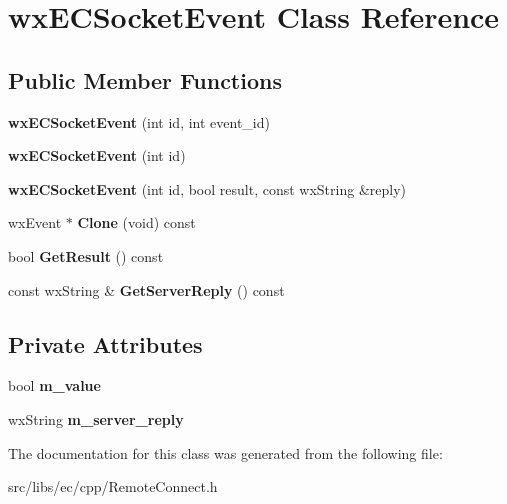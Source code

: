 \section{wxECSocketEvent Class Reference}
\label{classwxECSocketEvent}
\subsection*{Public Member Functions}
\begin{DoxyCompactItemize}
\item 
{\bfseries wxECSocketEvent} (int id, int event\_\-id)\label{classwxECSocketEvent_a844b5de3aa7691a620aba8c33089d160}

\item 
{\bfseries wxECSocketEvent} (int id)\label{classwxECSocketEvent_a13836a740ff950ad07b2ea7fb424c938}

\item 
{\bfseries wxECSocketEvent} (int id, bool result, const wxString \&reply)\label{classwxECSocketEvent_af3c42a4540201b47a97b08b8de0f4499}

\item 
wxEvent $\ast$ {\bfseries Clone} (void) const \label{classwxECSocketEvent_aeb68d4e210a56ff883102925ff5e8a95}

\item 
bool {\bfseries GetResult} () const \label{classwxECSocketEvent_a6447b7e93520f7892c0d205ce862c97c}

\item 
const wxString \& {\bfseries GetServerReply} () const \label{classwxECSocketEvent_a17ff1de3f95d59c14cac1bfe3d26c659}

\end{DoxyCompactItemize}
\subsection*{Private Attributes}
\begin{DoxyCompactItemize}
\item 
bool {\bfseries m\_\-value}\label{classwxECSocketEvent_a0403846a86fd7e17e1dbc775957c2eb7}

\item 
wxString {\bfseries m\_\-server\_\-reply}\label{classwxECSocketEvent_a86b73e298c65a30a7ff9783f6419bdee}

\end{DoxyCompactItemize}


The documentation for this class was generated from the following file:\begin{DoxyCompactItemize}
\item 
src/libs/ec/cpp/RemoteConnect.h\end{DoxyCompactItemize}
